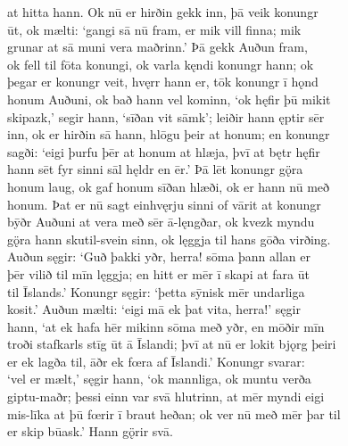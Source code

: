 \documentclass[12pt,letterpaper]{book}
\begin{document}
\begin{linenumbers}
at hitta hann.  Ok nū er hirðin gekk inn, þā veik konungr\\
ūt, ok mælti: `gangi sā nū fram, er mik vill finna; mik\\
grunar at sā muni vera maðrinn.'  Þā gekk Auðun fram,\\
ok fell til fōta konungi, ok varla kęndi konungr hann; ok\\
þegar er konungr veit, hvęrr hann er, tōk konungr ī hǫnd\\
honum Auðuni, ok bað hann vel kominn, `ok hęfir þū mikit\\
skipazk,' segir hann, `sīðan vit sāmk'; leiðir hann ęptir sēr\\
inn, ok er hirðin sā hann, hlōgu þeir at honum; en konungr\\
sagði: `eigi þurfu þēr at honum at hlæja, þvī at bętr hęfir\\
hann sēt fyr sinni sāl hęldr en ēr.'  Þā lēt konungr gǫ̈ra\\
honum laug, ok gaf honum sīðan hlæði, ok er hann nū með\\
honum.  Þat er nū sagt einhvęrju sinni of vārit at konungr\\
bȳðr Auðuni at vera með sēr ā-lęngðar, ok kvezk myndu\\
gǫ̈ra hann skutil-svein sinn, ok lęggja til hans gōða virðing.\\
Auðun sęgir: `Guð þakki yðr, herra! sōma þann allan er\\
þēr vilið til mīn lęggja; en hitt er mēr ī skapi at fara ūt\\
til Īslands.'  Konungr sęgir: `þetta sȳnisk mēr undarliga\\
kosit.'  Auðun mælti: `eigi mā ek þat vita, herra!' sęgir\\
hann, `at ek hafa hēr mikinn sōma með yðr, en mōðir mīn\\
troði stafkarls stīg ūt ā Īslandi; þvī at nū er lokit bjǫrg þeiri\\
er ek lagða til, āðr ek fœra af Īslandi.'  Konungr svarar:\\
`vel er mælt,' sęgir hann, `ok mannliga, ok muntu verða\\
giptu-maðr; þessi einn var svā hlutrinn, at mēr myndi eigi\\
mis-līka at þū fœrir ī braut heðan; ok ver nū með mēr þar til\\
er skip būask.'  Hann gǫ̈rir svā.


\end{linenumbers}
\end{document}
